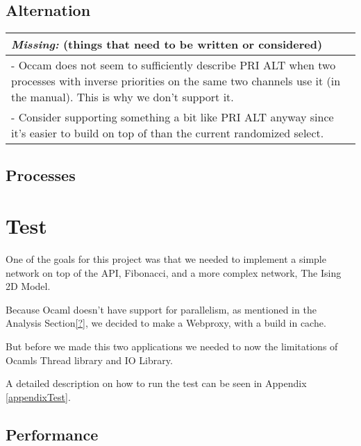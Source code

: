 \documentclass[a4paper,12pt]{article}
\newcommand{\missing}[1]{
  \begin{tabular}{|p{11cm}|}
    \hline
    \emph{Missing:} {\scriptsize (things that need to be written or considered)} \\
    \hline
    #1
    \hline
  \end{tabular}
}
\begin{document}
\subsection{Alternation}

\missing{
- Occam does not seem to sufficiently describe PRI ALT when two processes with inverse priorities
on the same two channels use it (in the manual). This is why we don't support it. \\
- Consider supporting something a bit like PRI ALT anyway since it's easier to build on top of
than the current randomized select. \\
}

\subsection{Processes}

\section{Test}
\label{test}
One of the goals for this project was that we needed to implement a simple
network on top of the API, Fibonacci, and a more complex network, The Ising 2D
Model.

Because Ocaml doesn't have support for parallelism, as mentioned in the Analysis
Section\ref{?}, we decided to make a Webproxy, with a build in cache.

But before we made this two applications we needed to now the limitations of
Ocamls Thread library and IO Library.

A detailed description on how to run the test can be seen in
Appendix \ref{appendixTest}.

\subsection{Performance}
\end{document}
